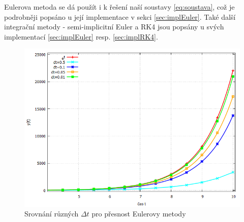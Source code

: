 Eulerova metoda se dá použít i k řešení naší soustavy \eqref{eq:soustava}, což je podrobněji popsáno u její implementace v sekci \ref{sec:implEuler}. Také další integrační metody - semi-implicitní Euler a RK4 jsou popsány u svých implementací
\ref{sec:implEuler} resp. \ref{sec:implRK4}.
\begin{figure}[p]
	\caption{Srovnání různých $ \Delta t $ pro přesnost Eulerovy metody}
	\label{fig:euler}
	\centering
	\includegraphics[width=\linewidth]{Figs/eulerTable}
\end{figure}









